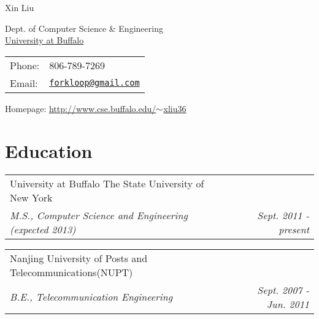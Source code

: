 \documentclass[letterpaper, 10pt]{article}
\makeatletter
\def\name{Xin Liu}
\renewenvironment{itemize}{
  \begin{list}{}{
    \setlength{\leftmargin}{1.5em}
  }
}{
  \end{list}
}
\newcommand{\ressubheading}[4]{
\begin{tabular*}{6.5in}{l@{\extracolsep{\fill}}r}
		#1 & #2 \\
		\textit{#3} & \textit{#4} \\
\end{tabular*}\vspace{-6pt}}
\makeatother
\begin{document}
{\huge \name}

\vspace{0.25in}
\begin{minipage}{0.65\textwidth}
Dept. of Computer Science \& Engineering\\
\href{http://www.buffalo.edu}{University at Buffalo}\\
\end{minipage}
\begin{minipage}{0.45\textwidth}\vspace{-0.1in}
\begin{tabular}{ll}
Phone: &806-789-7269 \\
Email: &\href{mailto:forkloop@gmail.com}{\tt forkloop@gmail.com} \\\end{tabular}
\end{minipage}
Homepage: \href{http://www.cse.buffalo.edu/~xliu36}{http://www.cse.buffalo.edu/$\small{\sim}$xliu36}

\section*{Education}
\begin{itemize}
\item
\ressubheading{University at Buffalo The State University of New York}{}{M.S., Computer Science and Engineering (expected 2013)}
{Sept. 2011 - present}

\item
\ressubheading{Nanjing University of Posts and Telecommunications(NUPT)}{}{B.E., Telecommunication Engineering}
{Sept. 2007 - Jun. 2011}
\end{itemize}
\end{document}
